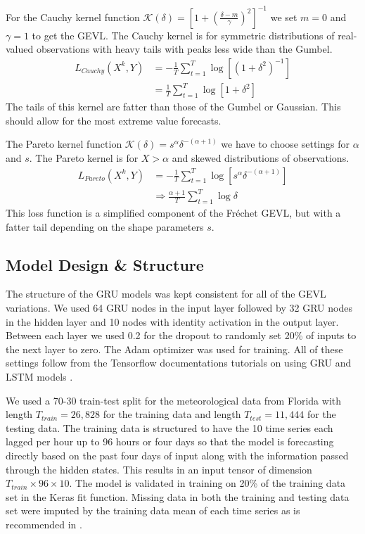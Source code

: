 \documentclass[conference]{IEEEtran}
\begin{document}
For the Cauchy kernel function $\mathcal{K}(\delta) = \left[1 + \left(\frac{\delta - m}{\gamma}\right)^{2}\right]^{-1}$ we set $m = 0$ and $\gamma = 1$ to get the GEVL. The Cauchy kernel is for symmetric distributions of real-valued observations with heavy tails with peaks less wide than the Gumbel.\begin{align*}
    L_{Cauchy}(X^k, Y) &= -\frac{1}{T} \sum_{t=1}^T \log \left[(1 + \delta^2)^{-1}\right] \\
    &= \frac{1}{T} \sum_{t=1}^T \log \left[1 + \delta^2 \right]
\end{align*}
The tails of this kernel are fatter than those of the Gumbel or Gaussian. This should allow for the most extreme value forecasts.

The Pareto kernel function $\mathcal{K}(\delta) = s^{\alpha} \delta^{-(\alpha+1)}$ we have to choose settings for $\alpha$ and $s$. The Pareto kernel is for $X > \alpha$  and skewed distributions of observations.
\begin{align*}
    L_{Pareto}(X^k, Y) &= -\frac{1}{T} \sum_{t=1}^T \log \left[s^{\alpha} \delta^{-(\alpha+1)}\right] \\
    &\Rightarrow \frac{\alpha + 1}{T} \sum_{t=1}^T \log\delta
\end{align*}
This loss function is a simplified component of the Fr\'echet GEVL, but with a fatter tail depending on the shape parameters $s$.

\subsection{Model Design \& Structure}

The structure of the GRU models was kept consistent for all of the GEVL variations. We used 64 GRU nodes in the input layer followed by 32 GRU nodes in the hidden layer and 10 nodes with identity activation in the output layer. Between each layer we used 0.2 for the dropout to randomly set 20\% of inputs to the next layer to zero. The Adam optimizer was used for training. All of these settings follow from the Tensorflow documentations tutorials on using GRU and LSTM models \cite{RecurrentNeuralNetworks, TimeSeriesForecasting}. 

We used a 70-30 train-test split for the meteorological data from Florida with length $T_{train} = 26,828$ for the training data and length $T_{test} = 11,444$ for the testing data. The training data is structured to have the 10 time series each lagged per hour up to 96 hours or four days so that the model is forecasting directly based on the past four days of input along with the information passed through the hidden states. This results in an input tensor of dimension $T_{train} \times 96 \times 10$. The model is validated in training on 20\% of the training data set in the Keras fit function. Missing data in both the training and testing data set were imputed by the training data mean of each time series as is recommended in \cite{cheRecurrentNeuralNetworks2018}. 
\end{document}
